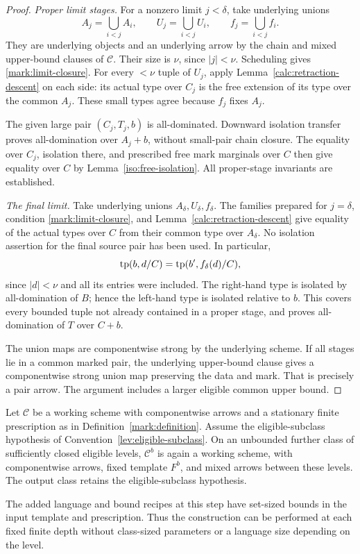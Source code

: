 \begin{proof}
\par\medskip\noindent\textit{Proper limit stages.}\quad
For a nonzero limit \(j<\delta\),
take underlying unions
\[
 A_j=\bigcup_{i<j}A_i,\qquad
 U_j=\bigcup_{i<j}U_i,\qquad
 f_j=\bigcup_{i<j}f_i .
\]
They are underlying objects
and an underlying arrow by
the chain and mixed upper-bound
clauses of \(\mathcal C\).
Their size is \(\nu\), since
\(|j|<\nu\).  Scheduling gives
\eqref{mark:limit-closure}.
For every \(<\nu\) tuple of
\(U_j\), apply
Lemma~\ref{calc:retraction-descent}
on each side: its actual
type over \(C_j\) is the
free extension of its type
over the common \(A_j\).
These small types agree
because \(f_j\) fixes \(A_j\).

The given large pair
\((C_j,T_j,b)\) is all-dominated.
Downward isolation transfer
proves all-domination over
\(A_j+b\), without small-pair
chain closure.  The equality
over \(C_j\), isolation there,
and prescribed free mark
marginals over \(C\) then
give equality over \(C\) by
Lemma~\ref{iso:free-isolation}.
All proper-stage invariants
are established.

\par\medskip\noindent\textit{The final limit.}\quad
Take underlying unions
\(A_\delta,U_\delta,f_\delta\).
The families prepared for
\(j=\delta\), condition
\eqref{mark:limit-closure},
and Lemma~\ref{calc:retraction-descent}
give equality of the actual
types over \(C\) from their
common type over \(A_\delta\).
No isolation assertion for
the final source pair has
been used.  In particular,
\[
       \operatorname{tp}(b,d/C)
          =\operatorname{tp}(b',f_\delta(d)/C),
\]
since \(|d|<\nu\) and all its
entries were included.
The right-hand type is
isolated by all-domination
of \(B\); hence the left-hand
type is isolated relative
to \(b\).  This covers every
bounded tuple not already
contained in a proper stage,
and proves all-domination
of \(T\) over \(C+b\).

The union maps are componentwise
strong by the underlying
scheme.  If all stages lie
in a common marked pair,
the underlying upper-bound
clause gives a componentwise
strong union map preserving
the data and mark.  That
is precisely a pair arrow.
The argument includes a
larger eligible common upper
bound.
\end{proof}

\begin{theorem}
\label{mark:package}
Let \(\mathcal C\) be a working scheme
with componentwise arrows and a stationary
finite prescription as in
Definition~\ref{mark:definition}.
Assume the eligible-subclass hypothesis of
Convention~\ref{lev:eligible-subclass}.
On an unbounded further class of sufficiently closed
eligible levels, \(\mathcal C^b\) is again
a working scheme, with componentwise
arrows, fixed template \(F^b\), and mixed
arrows between these levels.  The output class
retains the eligible-subclass hypothesis.

The added language and bound recipes
at this step have set-sized bounds in
the input template and prescription.
Thus the construction can be performed
at each fixed finite depth without
class-sized parameters or a language
size depending on the level.
\end{theorem}

